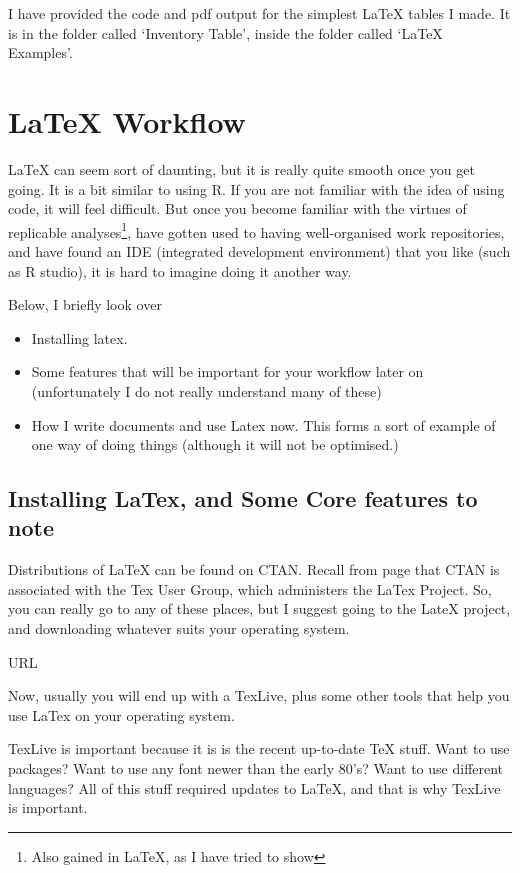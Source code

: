 \documentclass[11pt, oneside]{memoir}
\begin{document}
I have provided the code and pdf output for the simplest \LaTeX{} tables I made. It is in the folder called `Inventory Table', inside the folder called `LaTeX Examples'.

\chapter{\LaTeX{} Workflow}

\LaTeX{} can seem sort of daunting, but it is really quite smooth once you get going. It is a bit similar to using R. If you are not familiar with the idea of using code, it will feel difficult. But once you become familiar with the virtues of replicable analyses\footnote{Also gained in LaTeX, as I have tried to show}, have gotten used to having well-organised work repositories, and have found an IDE (integrated development environment) that you like (such as R studio), it is hard to imagine doing it another way.

Below, I briefly look over
\begin{itemize}
    \item Installing latex.
    \item Some features that will be important for your workflow later on (unfortunately I do not really understand many of these)
    \item How I write documents and use Latex now. This forms a sort of example of one way of doing things (although it will not be optimised.)
\end{itemize}

\section{Installing LaTex, and Some Core features to note}

Distributions of LaTeX can be found on CTAN. Recall from page \pageref{TUG} that CTAN is associated with the Tex User Group, which administers the LaTex Project. So, you can really go to any of these places, but I suggest going to the LateX project, and downloading whatever suits your operating system.

URL

Now, usually you will end up with a TexLive, plus some other tools that help you use LaTex on your operating system.

TexLive is important because it is is the recent up-to-date TeX stuff. Want to use packages? Want to use any font newer than the early 80's? Want to use different languages? All of this stuff required updates to LaTeX, and that is why TexLive is important.
\end{document}
